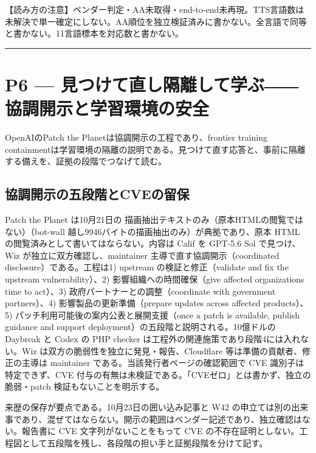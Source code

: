 \documentclass[lualatex,a4paper,10pt]{jlreq}
\begin{document}
\begin{tcolorbox}[colback=SurveySoft,colframe=SurveyRule,arc=1mm,boxrule=0.4pt,left=2mm,right=2mm]
【読み方の注意】ベンダー判定・AA未取得・end-to-end未再現。TTS言語数は未解決で単一確定にしない。AA順位を独立検証済みに書かない。全言語で同等と書かない。11言語標本を対応数と書かない。

\end{tcolorbox}


\bigskip\hrule\bigskip


\section{P6 --- 見つけて直し隔離して学ぶ――協調開示と学習環境の安全}
\label{sec:P6}


OpenAIのPatch the Planetは協調開示の工程であり、frontier training containmentは学習環境の隔離の説明である。見つけて直す応答と、事前に隔離する備えを、証拠の段階でつなげて読む。


\subsection*{協調開示の五段階とCVEの留保}


Patch the Planet は10月21日の 描画抽出テキストのみ（原本HTMLの閲覧ではない）（bot-wall 越し9946バイトの描画抽出のみ）が典拠であり、原本 HTML の閲覧済みとして書いてはならない。内容は Calif を GPT-5.6 Sol で見つけ、Wiz が独立に双方確認し、maintainer 主導で直す協調開示（coordinated disclosure）である。工程は1) upstream の検証と修正（validate and fix the upstream vulnerability）、2) 影響組織への時間確保（give affected organizations time to act）、3) 政府パートナーとの調整（coordinate with government partners）、4) 影響製品の更新準備（prepare updates across affected products）、5) パッチ利用可能後の案内公表と展開支援（once a patch is available, publish guidance and support deployment）の五段階と説明される。10億ドルの Daybreak と Codex の PHP checker は工程外の関連施策であり段階4には入れない。Wiz は双方の脆弱性を独立に発見・報告、Cloudflare 等は準備の貢献者、修正の主導は maintainer である。当該発行者ページの確認範囲で CVE 識別子は特定できず、CVE 付与の有無は未検証である。「CVEゼロ」とは書かず、独立の脆弱・patch 検証もないことを明示する。


来歴の保存が要点である。10月23日の囲い込み記事と W42 の申立ては別の出来事であり、混ぜてはならない。開示の範囲はベンダー記述であり、独立確認はない。報告書に CVE 文字列がないことをもって CVE の不存在証明としない。工程図として五段階を残し、各段階の担い手と証拠段階を分けて記す。
\end{document}
